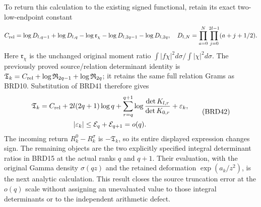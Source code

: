 \documentclass[11pt,a4paper]{article}
\begin{document}
To return this calculation to the existing signed functional,
retain its exact two-low-endpoint constant
\[
 C_{\rm rel}=\log D_{l,q-1}+\log D_{l,q}
 -\log\mathfrak r_\chi-\log D_{l,2q-1}-\log D_{l,2q},
 \quad D_{l,N}=\prod_{a=0}^N\prod_{j=0}^{2l-1}(a+j+1/2).
\]
Here $\mathfrak r_\chi$ is the unchanged original moment ratio
$\int|f\chi|^2d\sigma/\int|\chi|^2d\sigma$.
The previously proved source/relation determinant identity is
$\mathfrak T_k=C_{\rm rel}+\log\mathfrak R_{2q-1}
+\log\mathfrak R_{2q}$; it retains the same full relation Grams
as BRD10. Substitution of BRD41 therefore gives
\[
\begin{gathered}
 \mathfrak T_k=C_{\rm rel}+2l(2q+1)\log q
   +\sum_{r=q}^{q+1}\log\frac{\det K_{l,r}}{\det K_{0,r}}
   +\varepsilon_k,\\
 |\varepsilon_k|\leq\mathcal E_q+\mathcal E_{q+1}=o(q).
\end{gathered}\tag{BRD42}
\]
The incoming return $R_k^0-R_k^\sigma$ is $-\mathfrak T_k$,
so its entire displayed expression changes sign. The remaining
objects are the two explicitly specified integral determinant
ratios in BRD15 at the actual ranks $q$ and $q+1$. Their
evaluation, with the original Gamma density $\sigma(qz)$ and
the retained deformation $\exp(a_k/z^2)$, is the next analytic
calculation. This result closes the source truncation error at
the $o(q)$ scale without assigning an unevaluated value to those
integral determinants or to the independent arithmetic defect.
\end{document}
